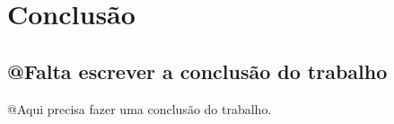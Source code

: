\chapter*[Conclusão]{Conclusão}

\section{@Falta escrever a conclusão do trabalho}
@Aqui precisa fazer uma conclusão do trabalho.
